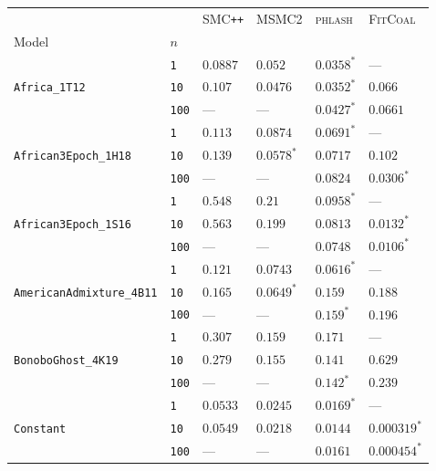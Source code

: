 \begin{footnotesize}
\begin{tabular}{llllll}
\toprule
 &  & \textsc{SMC}\texttt{{++}} & \textsc{MSMC2} & \textsc{phlash} & \textsc{FitCoal} \\
Model & $n$ &  &  &  &  \\
\midrule
\multirow[c]{3}{*}{\texttt{Africa\_1T12}} & \texttt{1} & $0.0887$ & $0.052$ & $\mathbf{0.0358}^*$ & --- \\
 & \texttt{10} & $0.107$ & $0.0476$ & $\mathbf{0.0352}^*$ & $0.066$ \\
 & \texttt{100} & --- & --- & $\mathbf{0.0427}^*$ & $0.0661$ \\
\cline{1-6}
\multirow[c]{3}{*}{\texttt{African3Epoch\_1H18}} & \texttt{1} & $0.113$ & $0.0874$ & $\mathbf{0.0691}^*$ & --- \\
 & \texttt{10} & $0.139$ & $\mathbf{0.0578}^*$ & $0.0717$ & $0.102$ \\
 & \texttt{100} & --- & --- & $0.0824$ & $\mathbf{0.0306}^*$ \\
\cline{1-6}
\multirow[c]{3}{*}{\texttt{African3Epoch\_1S16}} & \texttt{1} & $0.548$ & $0.21$ & $\mathbf{0.0958}^*$ & --- \\
 & \texttt{10} & $0.563$ & $0.199$ & $0.0813$ & $\mathbf{0.0132}^*$ \\
 & \texttt{100} & --- & --- & $0.0748$ & $\mathbf{0.0106}^*$ \\
\cline{1-6}
\multirow[c]{3}{*}{\texttt{AmericanAdmixture\_4B11}} & \texttt{1} & $0.121$ & $0.0743$ & $\mathbf{0.0616}^*$ & --- \\
 & \texttt{10} & $0.165$ & $\mathbf{0.0649}^*$ & $0.159$ & $0.188$ \\
 & \texttt{100} & --- & --- & $\mathbf{0.159}^*$ & $0.196$ \\
\cline{1-6}
\multirow[c]{3}{*}{\texttt{BonoboGhost\_4K19}} & \texttt{1} & $0.307$ & $\mathbf{0.159}$ & $0.171$ & --- \\
 & \texttt{10} & $0.279$ & $0.155$ & $\mathbf{0.141}$ & $0.629$ \\
 & \texttt{100} & --- & --- & $\mathbf{0.142}^*$ & $0.239$ \\
\cline{1-6}
\multirow[c]{3}{*}{\texttt{Constant}} & \texttt{1} & $0.0533$ & $0.0245$ & $\mathbf{0.0169}^*$ & --- \\
 & \texttt{10} & $0.0549$ & $0.0218$ & $0.0144$ & $\mathbf{0.000319}^*$ \\
 & \texttt{100} & --- & --- & $0.0161$ & $\mathbf{0.000454}^*$ \\
\cline{1-6}

\end{tabular}
\end{footnotesize}
